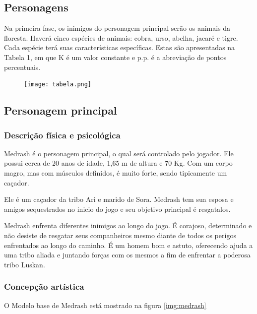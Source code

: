 \subsection{Personagens}
Na primeira fase, os inimigos do personagem principal serão os animais da floresta. 
Haverá cinco espécies de animais: cobra, urso, abelha, jacaré e tigre. Cada espécie 
terá suas características específicas. Estas são apresentadas na Tabela 1, em que K 
é um valor constante e p.p. é a abreviação de pontos percentuais.

\begin{figure}[!ht]
 \centering
 \texttt{[image: tabela.png]}
 \caption{}
 \label{img:tabela}
\end{figure}

\subsection{Personagem principal}
\subsubsection{Descrição física e psicológica}
Medrash é o personagem principal, o qual será controlado pelo jogador. Ele
 possui cerca de 20 anos de idade, 1,65 m de altura e 70 Kg. Com um corpo
 magro, mas com músculos definidos, é muito forte, sendo tipicamente um
 caçador.

Ele é um caçador da tribo Ari e marido de Sora. Medrash tem sua esposa e
 amigos sequestrados no inicio do jogo e seu objetivo principal é 
resgatalos.

Medrash enfrenta diferentes inimigos ao longo do jogo. É corajoso,
 determinado e não desiste de resgatar seus companheiros mesmo diante de
 todos os perigos enfrentados ao longo do caminho. É um homem bom e astuto,
 oferecendo ajuda a uma tribo aliada e juntando forças com os mesmos a fim
 de enfrentar a poderosa tribo Luskan.

\subsubsection{Concepção artística}
O Modelo base de Medrash está mostrado na figura \ref{img:medrash}

